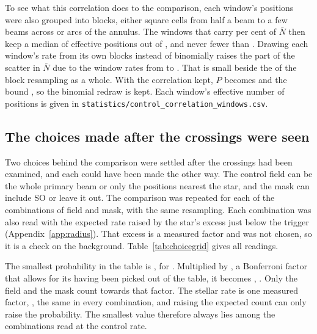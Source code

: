 To see what this correlation does to the comparison, each window's positions
were also grouped into blocks, either square cells from half a beam to a few
beams across or arcs of the annulus. The \CcNLead{} windows that carry
\CcLeadPct{} per cent of $\bar N$ then keep a median of \CcNeffLeadMed{}
effective positions out of \NCtrl, and never fewer than \CcNeffLeadMin.
Drawing each window's rate from its own blocks instead of binomially raises
the part of the scatter in $\bar N$ due to the window rates from
\CcSdBinom{} to \CcSdCorr. That is small beside the \CcSdTotal{} of the block
resampling as a whole. With the correlation kept, $P$ becomes
\CcProbRange{} and the bound \CcAddLimRange, so the binomial redraw is kept.
Each window's effective number of positions is given in
\texttt{statistics/\allowbreak control\_correlation\_windows.csv}.

\subsection{The choices made after the crossings were seen}
\label{sec:choicegrid}

Two choices behind the comparison were settled after the crossings had been
examined, and each could have been made the other way. The control field
can be the whole primary beam or only the positions nearest the star, and
the mask can include SO or leave it out. The comparison was repeated for
each of the \CgNTrialWord{} combinations of field and mask, with the same
resampling. Each combination was also read with the expected rate raised by
the star's excess just below the trigger (Appendix~\ref{app:radius}). That
excess is a measured factor and was not chosen, so it is a check on the
background. Table~\ref{tab:choicegrid}
gives all \CgNCellWord{} readings.

The smallest probability in the table is \CgMinProb, for \CgMinCell.
Multiplied by \CgNTrialWord, a Bonferroni factor that allows for its having
been picked out of the table, it becomes \CgBonfProb, \CgVerdictClause.
Only the field and the mask count towards that factor. The stellar rate
is one measured factor, \CeNear, the same in every combination, and raising
the expected count can only raise the probability. The smallest value therefore always lies among the
\CgNTrialWord{} combinations read at the control rate.

\begin{table}
\centering
\scriptsize
\setlength{\tabcolsep}{3pt}
\caption{Unattributed crossings observed and expected, with the chance
probability, for each control field and line mask.}
\label{tab:choicegrid}

\end{table}

